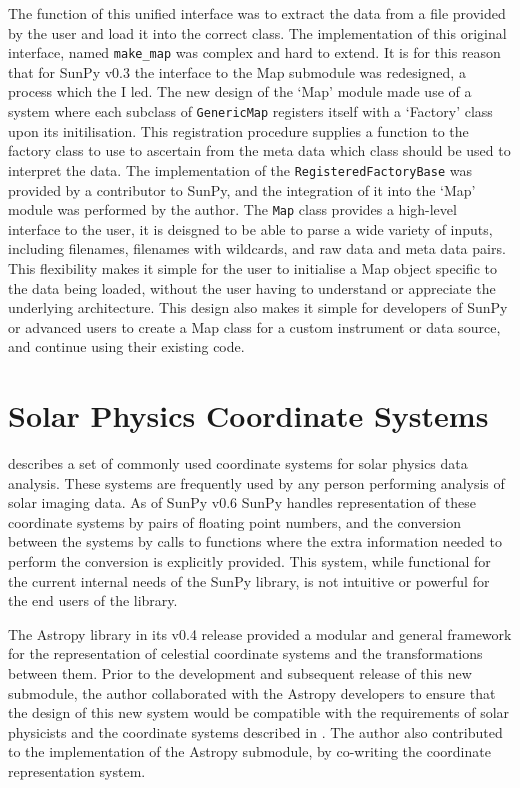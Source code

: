 \documentclass[a4paper,12pt,fourier,authoryear,custommargin]{Classes/PhDThesisPSnPDF}
\begin{document}
The function of this unified interface was to extract the data from a file provided by the user and load it into the correct class.
The implementation of this original interface, named \verb|make_map| was complex and hard to extend.
It is for this reason that for SunPy v0.3 the interface to the Map submodule was redesigned, a process which the I led.
The new design of the `Map' module made use of a system where each subclass of \verb|GenericMap| registers itself with a `Factory' class upon its initilisation.
This registration procedure supplies a function to the factory class to use to ascertain from the meta data which class should be used to interpret the data.
The implementation of the \verb|RegisteredFactoryBase| was provided by a contributor to SunPy, and the integration of it into the `Map' module was performed by the author.
The \verb|Map| class provides a high-level interface to the user, it is deisgned to be able to parse a wide variety of inputs, including filenames, filenames with wildcards, and raw data and meta data pairs.
This flexibility makes it simple for the user to initialise a Map object specific to the data being loaded, without the user having to understand or appreciate the underlying architecture.
This design also makes it simple for developers of SunPy or advanced users to create a Map class for a custom instrument or data source, and continue using their existing code.

\section{Solar Physics Coordinate Systems}

\cite{thompson2006} describes a set of commonly used coordinate systems for solar physics data analysis.
These systems are frequently used by any person performing analysis of solar imaging data.
As of SunPy v0.6 SunPy handles representation of these coordinate systems by pairs of floating point numbers, and the conversion between the systems by calls to functions where the extra information needed to perform the conversion is explicitly provided.
This system, while functional for the current internal needs of the SunPy library, is not intuitive or powerful for the end users of the library.

The Astropy library \citep{theastropycollaboration2013} in its v0.4 release provided a modular and general framework for the representation of celestial coordinate systems and the transformations between them.
Prior to the development and subsequent release of this new submodule, the author collaborated with the Astropy developers to ensure that the design of this new system would be compatible with the requirements of solar physicists and the coordinate systems described in \cite{thompson2006}.
The author also contributed to the implementation of the Astropy submodule, by co-writing the coordinate representation system.
\end{document}
